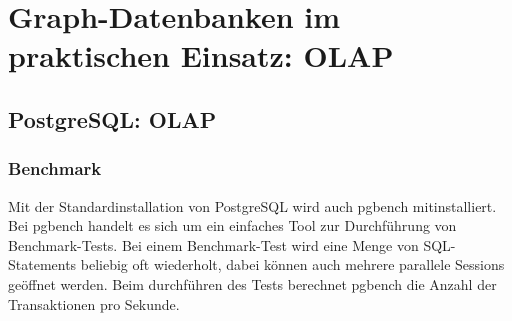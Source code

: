 \chapter{Graph-Datenbanken im praktischen Einsatz: OLAP}
\section{PostgreSQL: OLAP}
\subsection{Benchmark}
Mit der Standardinstallation von PostgreSQL wird auch pgbench mitinstalliert. Bei pgbench handelt es sich um ein einfaches Tool zur Durchführung von Benchmark-Tests. Bei einem Benchmark-Test wird eine Menge von \ac{SQL}-Statements beliebig oft wiederholt, dabei können auch mehrere parallele Sessions geöffnet werden. Beim durchführen des Tests berechnet pgbench die Anzahl der Transaktionen pro Sekunde.
